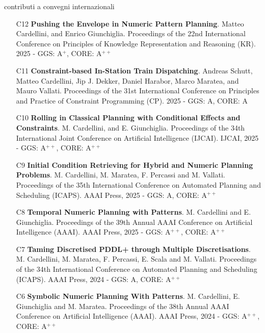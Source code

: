 \documentclass{resume} %
\begin{document}
\begin{rSection}{contributi a convegni internazionali}
\begin{enumerate}[leftmargin=5mm]
	\item[C12] \textbf{Pushing the Envelope in Numeric Pattern Planning}. Matteo Cardellini, and Enrico Giunchiglia. Proceedings of the 22nd International Conference on Principles of Knowledge Representation and Reasoning (KR). 2025 - GGS: A$^{+}$, CORE: A$^{++}$
	
	
	\item[C11] \textbf{Constraint-based In-Station Train Dispatching}. Andreas Schutt, Matteo Cardellini, Jip J. Dekker, Daniel Harabor, Marco Maratea, and Mauro Vallati. Proceedings of the 31st International Conference on Principles and Practice of Constraint Programming (CP). 2025 - GGS: A, CORE: A
	
	
	\item[C10] \textbf{Rolling in Classical Planning with Conditional Effects and Constraints}. M. Cardellini, and E. Giunchiglia. Proceedings of the 34th International Joint Conference on Artificial Intelligence (IJCAI). IJCAI, 2025 - GGS: A$^{++}$, CORE: A$^{++}$
	
	\item[C9] \textbf{Initial Condition Retrieving for Hybrid and Numeric Planning Problems}. M. Cardellini, M. Maratea, F. Percassi and M. Vallati. Proceedings of the 35th International Conference on Automated Planning and Scheduling (ICAPS). AAAI Press, 2025 - GGS: A, CORE: A$^{++}$
	
	
	\item[C8] \textbf{Temporal Numeric Planning with Patterns}. M. Cardellini and E. Giunchiglia. Proceedings of the 39th Annual AAAI Conference on Artificial Intelligence (AAAI). AAAI Press, 2025 - GGS: A$^{++}$, CORE: A$^{++}$
	
	\item[C7] \textbf{Taming Discretised PDDL+ through Multiple Discretisations}. M. Cardellini, M. Maratea, F. Percassi, E. Scala and M. Vallati. Proceedings of the 34th International Conference on Automated Planning and Scheduling (ICAPS). AAAI Press, 2024 - GGS: A, CORE: A$^{++}$
	
	\item[C6] \textbf{Symbolic Numeric Planning With Patterns}. M. Cardellini, E. Giunchiglia and M. Maratea. Proceedings of the 38th Annual AAAI Conference on Artificial Intelligence (AAAI). AAAI Press, 2024 - GGS: A$^{++}$, CORE: A$^{++}$
	

\end{enumerate}
\end{rSection}
\end{document}
